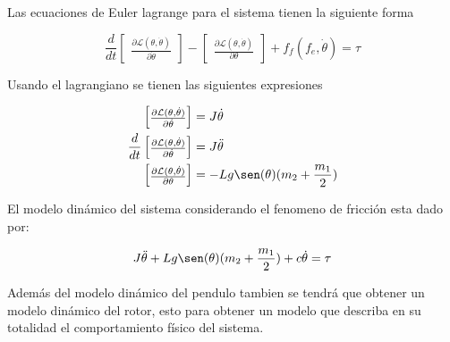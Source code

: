 \documentclass[a4paper]{IEEEtran} %
\begin{document}
Las ecuaciones de Euler lagrange para el sistema tienen la siguiente forma

\begin{equation}
    \frac{d}{dt}\begin{bmatrix}
        \frac{\partial \mathcal{L}(\theta,\dot{\theta})}{\partial\dot{\theta}}
    \end{bmatrix}-\begin{bmatrix}
        \frac{\partial \mathcal{L}(\theta,\dot{\theta})}{\partial \theta}
    \end{bmatrix}+f_f(f_e,\dot{\theta})=\tau
    \label{eq:eu_lagran}
\end{equation}

Usando el lagrangiano se tienen las siguientes expresiones

\begin{equation}
    \begin{split}
        \begin{bmatrix}
            \frac{\partial \mathcal{L}(\theta,\dot{\theta})}{\partial\dot{\theta}}
        \end{bmatrix}&=J\dot{\theta}\\
        \frac{d}{dt}\begin{bmatrix}
            \frac{\partial\mathcal{L}(\theta,\dot{\theta})}{\partial\dot{\theta}}
        \end{bmatrix}&=J\ddot{\theta}\\
        \begin{bmatrix}
            \frac{\partial \mathcal{L}(\theta,\dot{\theta})}{\partial \theta}
        \end{bmatrix}&=-Lg\sen(\theta)(m_2 + \frac{m_1}{2})\\
    \end{split}
    \label{eq:dq}
\end{equation}

El modelo dinámico del sistema considerando el fenomeno de fricción esta dado por:

\begin{equation}
    J\ddot{\theta}+Lg\sen(\theta)(m_2+\frac{m_1}{2})+c\dot{\theta}=\tau
    \label{eq:din_model}
\end{equation}

Además del modelo dinámico del pendulo tambien se tendrá que obtener un modelo dinámico del rotor, esto para obtener un modelo que describa en su totalidad el comportamiento físico del sistema.
\end{document}
